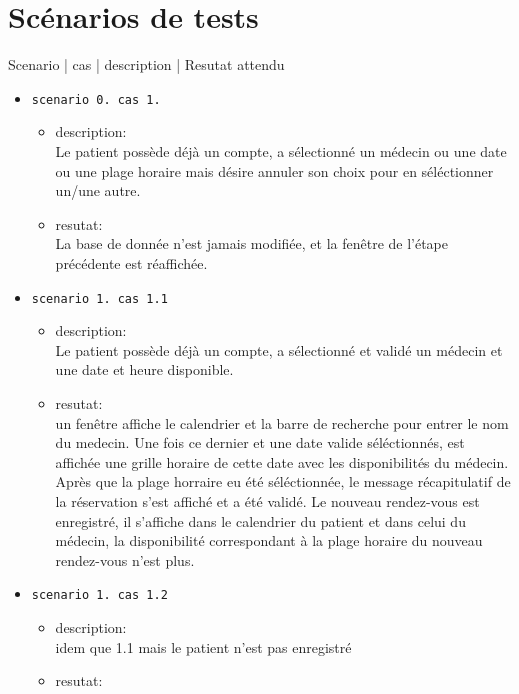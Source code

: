 \documentclass[a4paper, 11pt]{report}
\begin{document}
	\section{Scénarios de tests}
	Scenario |   cas  |         description    |   Resutat attendu 

	\begin{itemize}
		\item[] \texttt{scenario 0. cas 1.} 
			\begin{itemize}
				\item description: \\
					Le patient possède déjà un compte, a sélectionné un médecin ou une date ou une
					plage horaire mais désire annuler son choix pour en séléctionner un/une autre.
				\item resutat:\\
					La base de donnée n’est jamais modifiée, et la fenêtre de l’étape précédente
					est réaffichée.\\
			\end{itemize}
		\item[] \texttt{scenario 1. cas 1.1}
			\begin{itemize}
				\item description:  \\
					Le patient possède déjà un compte, a sélectionné et validé
					un médecin et une date et heure disponible.
				\item resutat: \\
					un fenêtre affiche le calendrier et la barre de recherche
					pour entrer le nom du medecin. 
					Une fois ce dernier et une date valide séléctionnés, est
					affichée une grille horaire de cette date avec les
					disponibilités du médecin. Après que la plage horraire eu
					été séléctionnée, 
					le message récapitulatif de la réservation s’est affiché et
					a été validé. 
					Le nouveau rendez-vous est enregistré, il s’affiche dans le
					calendrier du patient et dans celui du médecin, la
					disponibilité correspondant à la plage horaire du nouveau
					rendez-vous n’est plus.\\
			\end{itemize}
		\item[] \texttt{scenario 1. cas 1.2}
			\begin{itemize}
				\item description:  \\
					idem que 1.1 mais le patient n’est pas enregistré
				\item resutat: \\

\end{itemize}
\end{itemize}
\end{document}
